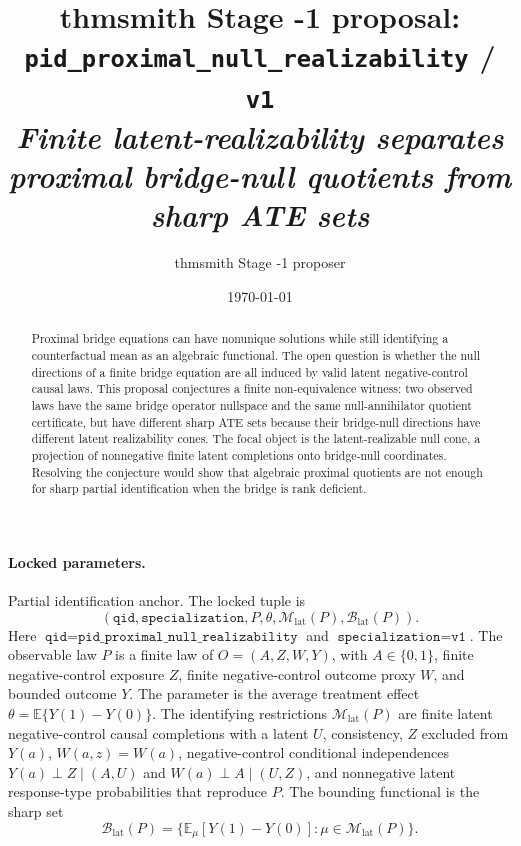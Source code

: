 \documentclass[11pt]{article}
\title{thmsmith Stage -1 proposal: \texttt{pid\_proximal\_null\_realizability} / \texttt{v1}%
  \\ \large\textit{Finite latent-realizability separates proximal bridge-null quotients from sharp ATE sets}}
\author{thmsmith Stage -1 proposer}
\date{\today}
\newcommand{\E}{\mathbb{E}}
\theoremstyle{definition}
\theoremstyle{plain}
\theoremstyle{remark}
\begin{document}
\maketitle


\paragraph{Locked parameters.}
Partial identification anchor. The locked tuple is
\[
(\texttt{qid},\texttt{specialization},P,\theta,\mathcal{M}_{\mathrm{lat}}(P),\mathcal{B}_{\mathrm{lat}}(P)).
\]
Here \(\texttt{qid}=\texttt{pid\_proximal\_null\_realizability}\) and \(\texttt{specialization}=\texttt{v1}\). The observable law \(P\) is a finite law of \(O=(A,Z,W,Y)\), with \(A\in\{0,1\}\), finite negative-control exposure \(Z\), finite negative-control outcome proxy \(W\), and bounded outcome \(Y\). The parameter is the average treatment effect \(\theta=\E\{Y(1)-Y(0)\}\). The identifying restrictions \(\mathcal{M}_{\mathrm{lat}}(P)\) are finite latent negative-control causal completions with a latent \(U\), consistency, \(Z\) excluded from \(Y(a)\), \(W(a,z)=W(a)\), negative-control conditional independences \(Y(a)\perp Z\mid(A,U)\) and \(W(a)\perp A\mid(U,Z)\), and nonnegative latent response-type probabilities that reproduce \(P\). The bounding functional is the sharp set
\[
\mathcal{B}_{\mathrm{lat}}(P)=\{\E_{\mu}[Y(1)-Y(0)]:\mu\in\mathcal{M}_{\mathrm{lat}}(P)\}.
\]

\begin{abstract}
Proximal bridge equations can have nonunique solutions while still identifying a counterfactual mean as an algebraic functional. The open question is whether the null directions of a finite bridge equation are all induced by valid latent negative-control causal laws. This proposal conjectures a finite non-equivalence witness: two observed laws have the same bridge operator nullspace and the same null-annihilator quotient certificate, but have different sharp ATE sets because their bridge-null directions have different latent realizability cones. The focal object is the latent-realizable null cone, a projection of nonnegative finite latent completions onto bridge-null coordinates. Resolving the conjecture would show that algebraic proximal quotients are not enough for sharp partial identification when the bridge is rank deficient.
\end{abstract}
\end{document}
